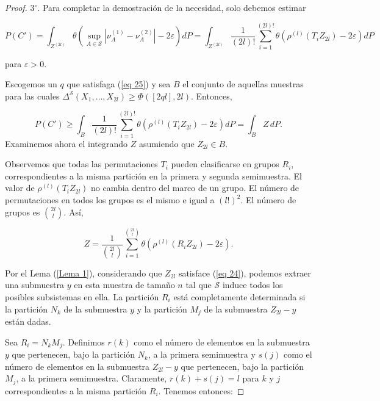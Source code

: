 \documentclass{report}
\begin{document}
\begin{proof}
\( 3^\circ \). Para completar la demostración de la necesidad, solo debemos estimar

\begin{equation*}
P(C') = \int_{Z^{(2l)}} \theta \left( \sup_{A \in \mathcal{S}} | \nu_A^{(1)} - \nu_A^{(2)} | - 2\varepsilon \right) dP
= \int_{Z^{(2l)}} \frac{1}{(2l)!} \sum_{i=1}^{(2l)!} \theta \left( \rho^{(l)} (T_i Z_{2l}) - 2\varepsilon \right) dP
\end{equation*}

para \( \varepsilon > 0 \).\newline

Escogemos un \( q \) que satisfaga (\ref{eq 25}) y sea \( B \) el conjunto de aquellas muestras para las cuales 
\( \Delta^{\mathcal{S}}(X_1, \dots, X_{2l}) \geq \Phi([ 2ql ], 2l) \). Entonces,

\begin{equation*}
P(C') \geq \int_B \frac{1}{(2l)!} \sum_{i=1}^{(2l)!} \theta \left( \rho^{(l)} (T_i Z_{2l}) - 2\varepsilon \right) dP
= \int_B Z \, dP.
\end{equation*}
Examinemos ahora el integrando \( Z \) asumiendo que \( Z_{2l} \in B \).\newline

Observemos que todas las permutaciones \( T_i \) pueden clasificarse en grupos \( R_i \),
correspondientes a la misma partición en la primera y segunda semimuestra.
El valor de \( \rho^{(l)} (T_i Z_{2l}) \) no cambia dentro del marco de un grupo.
El número de permutaciones en todos los grupos es el mismo e igual a \( (l!)^2 \).
El número de grupos es \( \binom{2l}{l} \). Así, 

\[
Z = \frac{1}{\binom{2l}{l}} \sum_{i=1}^{\binom{2l}{l}} \theta ( \rho^{(l)} (R_i Z_{2l}) - 2\varepsilon ).
\]

Por el Lema (\ref{Lema 1}), considerando que \( Z_{2l} \) satisface (\ref{eq 24}), podemos extraer una submuestra \( y \)
en esta muestra de tamaño \( n \) tal que \( \mathcal{S} \) induce todos los posibles subsistemas en ella.
La partición \( R_i \) está completamente determinada si la partición \( N_k \) de la submuestra \( y \)
y la partición \( M_j \) de la submuestra \( Z_{2l} - y \) están dadas.\newline

Sea \( R_i = N_k M_j \). Definimos \( r(k) \) como el número de elementos en la submuestra \( y \) que pertenecen,
bajo la partición \( N_k \), a la primera semimuestra y \( s(j) \) como el número de elementos en la submuestra
\( Z_{2l} - y \) que pertenecen, bajo la partición \( M_j \), a la primera semimuestra.
Claramente, \( r(k) + s(j) = l \) para \( k \) y \( j \) correspondientes a la misma partición \( R_i \).
Tenemos entonces:


\end{proof}
\end{document}
